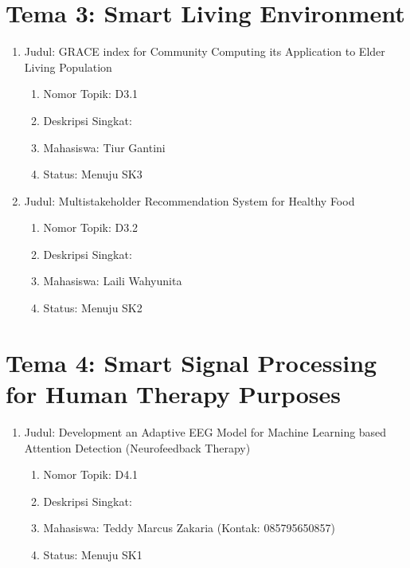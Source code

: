\documentclass[
  letterpaper,
  DIV=11,
  numbers=noendperiod]{scrreprt}
\providecommand{\tightlist}{%
  \setlength{\itemsep}{0pt}\setlength{\parskip}{0pt}}
\begin{document}
\section{Tema 3: Smart Living
Environment}\label{tema-3-smart-living-environment-2}

\begin{enumerate}
\def\labelenumi{\arabic{enumi}.}
\tightlist
\item
  Judul: GRACE index for Community Computing its Application to Elder
  Living Population

  \begin{enumerate}
  \def\labelenumii{\arabic{enumii}.}
  \tightlist
  \item
    Nomor Topik: D3.1
  \item
    Deskripsi Singkat:
  \item
    Mahasiswa: Tiur Gantini
  \item
    Status: Menuju SK3
  \end{enumerate}
\item
  Judul: Multistakeholder Recommendation System for Healthy Food

  \begin{enumerate}
  \def\labelenumii{\arabic{enumii}.}
  \tightlist
  \item
    Nomor Topik: D3.2
  \item
    Deskripsi Singkat:
  \item
    Mahasiswa: Laili Wahyunita
  \item
    Status: Menuju SK2
  \end{enumerate}
\end{enumerate}

\section{Tema 4: Smart Signal Processing for Human Therapy
Purposes}\label{tema-4-smart-signal-processing-for-human-therapy-purposes-2}

\begin{enumerate}
\def\labelenumi{\arabic{enumi}.}
\tightlist
\item
  Judul: Development an Adaptive EEG Model for Machine Learning based
  Attention Detection (Neurofeedback Therapy)

  \begin{enumerate}
  \def\labelenumii{\arabic{enumii}.}
  \tightlist
  \item
    Nomor Topik: D4.1
  \item
    Deskripsi Singkat:
  \item
    Mahasiswa: Teddy Marcus Zakaria (Kontak: 085795650857)
  \item
    Status: Menuju SK1
  \end{enumerate}
\end{enumerate}
\end{document}
